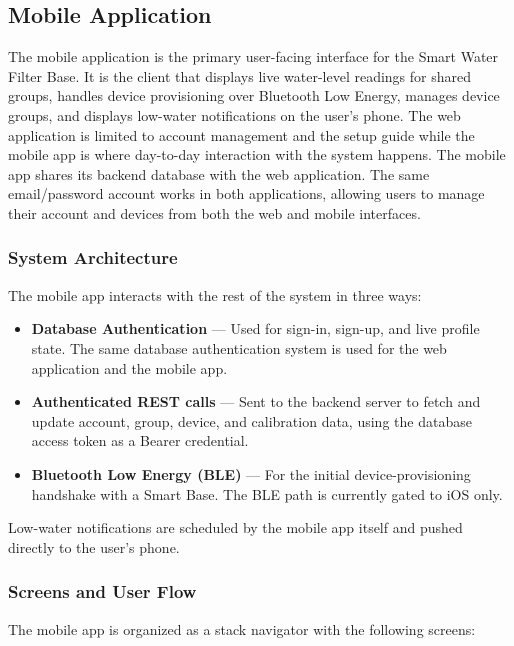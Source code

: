 \subsection{Mobile Application}

The mobile application is the primary user-facing interface for the Smart Water Filter Base. 
It is the client that displays live water-level readings for shared groups, handles device provisioning over Bluetooth Low Energy, 
manages device groups, and displays low-water notifications on the user's phone. The web application is limited to 
account management and the setup guide while the mobile app is where day-to-day interaction with the system happens.
The mobile app shares its backend database with the web application. The same email/password account works in both applications, allowing users to manage their account and devices from both the web and mobile interfaces.

\subsubsection{System Architecture}
The mobile app interacts with the rest of the system in three ways:

\begin{itemize}
    \item \textbf{Database Authentication} --- Used for sign-in, sign-up, and live profile state. The same database authentication system is used for the web application and the mobile app.
    \item \textbf{Authenticated REST calls} --- Sent to the backend server to fetch and update account, group, device, and calibration data, using the database access token as a Bearer credential.
    \item \textbf{Bluetooth Low Energy (BLE)} --- For the initial device-provisioning handshake with a Smart Base. The BLE path is currently gated to iOS only.
\end{itemize}

\noindent Low-water notifications are scheduled by the mobile app itself and pushed directly to the user's phone.

\subsubsection{Screens and User Flow}
The mobile app is organized as a stack navigator with the following screens:

